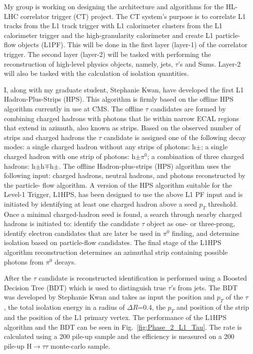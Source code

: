 \documentclass[preprint,12pt]{elsarticle}
\begin{document}
My group is working on designing the architecture and algorithms for the HL-LHC correlator 
trigger (CT) project. The CT system's purpose is
to correlate L1 tracks from the L1 track trigger with L1 calorimeter clusters from the
L1 calorimeter trigger and the high-granularity calorimeter and create L1 particle-flow objects (L1PF). 
This will be done in the first
layer (layer-1) of the correlator trigger. The second layer (layer-2) will be tasked with performing the 
reconstruction of high-level physics objects, namely, jets, $\tau$'s and Sums. Layer-2 will
also be tasked with the calculation of isolation quantities. 

I, along with my graduate student, Stephanie Kwan, have developed the first L1 Hadron-Plus-Strips (HPS).
This algorithm is firmly based on the offline HPS algorithm currently in use at CMS.
The offline $\tau$ candidates are formed by combining charged hadrons with photons that lie within 
narrow ECAL regions that extend in azimuth, also known as strips. Based on the observed number of 
strips and charged hadrons the $\tau$ candidate is assigned one of the following decay modes: 
a single charged hadron without any strips of photons: h$\pm$; a single charged hadron with one 
strip of photons: h$\pm\pi^{0}$; a combination of three charged hadrons: h$\pm$h$\mp$h$\pm$. 
The offline Hadron-plus-strips (HPS) algorithm uses the following input: charged hadrons, neutral 
hadrons, and photons reconstructed by the particle- flow algorithm. A version of the HPS algorithm 
suitable for the Level-1 Trigger, L1HPS, has been designed to use the above L1 PF input and 
is initiated by identifying at least one charged hadron above a seed $p_{T}$ threshold. Once a 
minimal charged-hadron seed is found, a search through nearby charged hadrons is initiated to: 
identify the candidate $\tau$ object as one- or three-prong, identify electron candidates that are 
later be used in $\pi^{0}$ finding, and determine isolation based on particle-flow candidates. 
The final stage of the L1HPS algorithm reconstruction determines an azimuthal strip containing possible photons 
from $\pi^{0}$ decays. 

After the $\tau$ candidate is reconstructed identification is performed using a Boosted Decision Tree (BDT)
which is used to distinguish true $\tau$'s from jets. The BDT was developed by Stephanie Kwan
and takes as input the position and $p_{T}$ of the $\tau$, the total isolation energy in a radius of $\Delta R$=0.4,
the $p_{T}$ and position of the strip and the position of the L1 primary vertex.
The performance of the L1HPS algorithm and the BDT can be seen in Fig.~\ref{fig:Phase_2_L1_Tau}.
The rate is calculated using a 200 pile-up sample and the efficiency is measured on a 200 pile-up
H$\rightarrow\tau\tau$ monte-carlo sample.
\end{document}

